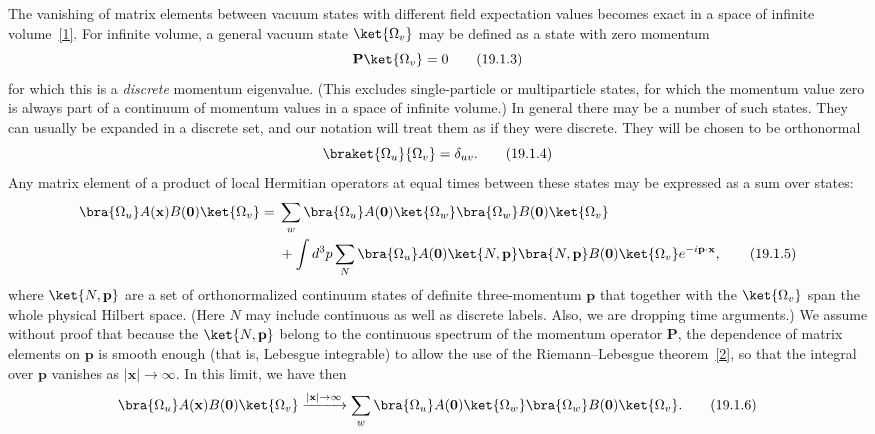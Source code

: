 The vanishing of matrix elements between vacuum states with different field
expectation values becomes exact in a space of infinite
volume~\hyperref[ch19-ref-1]{[1]}. For infinite volume, a general vacuum state
$\ket{\Omega_v}$ may be defined as a state with zero momentum
\begin{equation}
 \mathbf P\ket{\Omega_v}=0
 \tag{19.1.3}\label{eq:19.1.3}
\end{equation}
for which this is a \emph{discrete} momentum eigenvalue. (This excludes
single-particle or multiparticle states, for which the momentum value zero is
always part of a continuum of momentum values in a space of infinite
volume.) In general there may be a number of such states. They can usually be
expanded in a discrete set, and our notation will treat them as if they were
discrete. They will be chosen to be orthonormal
\begin{equation}
 \braket{\Omega_u}{\Omega_v}=\delta_{uv}.
 \tag{19.1.4}\label{eq:19.1.4}
\end{equation}
Any matrix element of a product of local Hermitian operators at equal times
between these states may be expressed as a sum over states:
\begin{align}
 \bra{\Omega_u}A(\mathbf x)B(\mathbf 0)\ket{\Omega_v}
 ={}&\sum_w
 \bra{\Omega_u}A(\mathbf 0)\ket{\Omega_w}
 \bra{\Omega_w}B(\mathbf 0)\ket{\Omega_v}
 \notag\\
 &+\int d^3p\sum_N
 \bra{\Omega_u}A(\mathbf 0)\ket{N,\mathbf p}
 \bra{N,\mathbf p}B(\mathbf 0)\ket{\Omega_v}
 e^{-i\mathbf p\cdot\mathbf x},
 \tag{19.1.5}\label{eq:19.1.5}
\end{align}
where $\ket{N,\mathbf p}$ are a set of orthonormalized continuum states of
definite three-momentum $\mathbf p$ that together with the
$\ket{\Omega_v}$ span the whole physical Hilbert space. (Here $N$ may include
continuous as well as discrete labels. Also, we are dropping time
arguments.) We assume without proof that because the $\ket{N,\mathbf p}$
belong to the continuous spectrum of the momentum operator $\mathbf P$, the
dependence of matrix elements on $\mathbf p$ is smooth enough (that is,
Lebesgue integrable) to allow the use of the Riemann--Lebesgue
theorem~\hyperref[ch19-ref-2]{[2]}, so that the integral over $\mathbf p$
vanishes as $\lvert\mathbf x\rvert\to\infty$. In this limit, we have then
\begin{equation}
 \bra{\Omega_u}A(\mathbf x)B(\mathbf 0)\ket{\Omega_v}
 \xrightarrow{\lvert\mathbf x\rvert\to\infty}
 \sum_w\bra{\Omega_u}A(\mathbf 0)\ket{\Omega_w}
 \bra{\Omega_w}B(\mathbf 0)\ket{\Omega_v}.
 \tag{19.1.6}\label{eq:19.1.6}
\end{equation}
